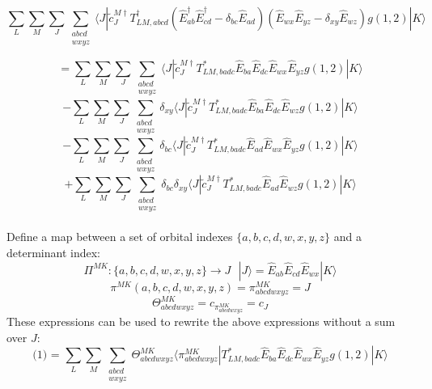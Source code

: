 \documentclass[12pt]{article}
\begin{document}
\begin{equation*}
\sum_{L} \sum_{M}\sum_{J}\sum_{\substack{abcd\\ wxyz}} 
\langle J |\tilde{c}^{M\dagger}_{J} T^{\dagger}_{LM,abcd}(\hat{E}^{\dagger}_{ab}
\hat{E}^{\dagger}_{cd}-\delta_{bc}\hat{E}_{ad})(\hat{E}_{wx}\hat{E}_{yz}-\delta_{xy}\hat{E}_{wz})g(1,2)|K\rangle
\end{equation*}

\begin{equation}
=\sum_{L} \sum_{M}\sum_{J}\sum_{\substack{abcd\\ wxyz}} 
\langle J |\tilde{c}^{M\dagger}_{J}T^{*}_{LM,badc}\hat{E}_{ba}\hat{E}_{dc}\hat{E}_{wx}\hat{E}_{yz}g(1,2)|K\rangle
\end{equation}
\begin{equation}
-\sum_{L} \sum_{M}\sum_{J}\sum_{\substack{abcd\\ wxyz}} 
\delta_{xy}\langle J |\tilde{c}^{M\dagger}_{J}T^{*}_{LM,badc}\hat{E}_{ba}\hat{E}_{dc}\hat{E}_{wz}g(1,2)|K\rangle
\end{equation}
\begin{equation}
-\sum_{L} \sum_{M}\sum_{J}\sum_{\substack{abcd\\ wxyz}} 
\delta_{bc}\langle J |\tilde{c}^{M\dagger}_{J}T^{*}_{LM,badc}\hat{E}_{ad}\hat{E}_{wx}\hat{E}_{yz}g(1,2)|K\rangle
\end{equation}
\begin{equation}
+\sum_{L} \sum_{M}\sum_{J}\sum_{\substack{abcd\\ wxyz}} 
\delta_{bc}\delta_{xy}\langle J |\tilde{c}^{M\dagger}_{J}T^{*}_{LM,badc}\hat{E}_{ad}\hat{E}_{wz}g(1,2)|K\rangle
\end{equation}
\\
\noindent Define a map between a set of orbital indexes $\{a,b,c,d,w,x,y,z\}$ and a determinant index:
\begin{equation*}
\Pi^{MK} : \{a,b,c,d,w,x,y,z\} \rightarrow J
 \text{ \ \ \ \ \ \ \ \ \ \ } | J\rangle = \hat{E}_{ab}\hat{E}_{cd}\hat{E}_{wx}|K\rangle 
\end{equation*}
\begin{equation*}
\pi^{MK} (a,b,c,d,w,x,y,z) =\pi^{MK}_{abcdwxyz}= J 
\end{equation*}
\begin{equation*}
\Theta^{MK}_{abcdwxyz} = c_{\pi^{MK}_{abcdwxyz}} = c_{J} 
\end{equation*}
These expressions can be used to rewrite the above expressions without a sum over $J$:
\begin{equation*}
\text{(1) = } \sum_{L} \sum_{M}  \sum_{\substack{abcd\\ wxyz}}\Theta^{MK}_{abcdwxyz} \langle \pi^{MK}_{abcdwxyz} |T^{*}_{LM,badc}\hat{E}_{ba}\hat{E}_{dc}\hat{E}_{wx}\hat{E}_{yz}g(1,2)|K\rangle
\end{equation*}
\end{document}
